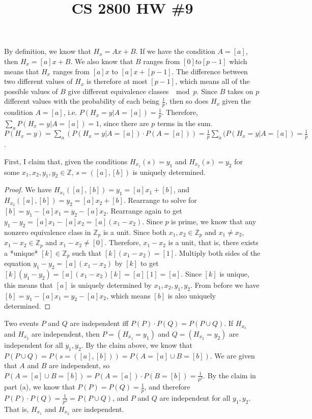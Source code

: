 

\title{CS 2800 HW \#9}
\author{\name}
\maketitle


By definition, we know that $H_x = Ax + B$. If we have the condition $A = [a]$, then $H_x = [a]x + B$. We also know that $B$ ranges from $[0] to [p - 1]$ which means that $H_x$ ranges from $[a]x$ to $[a]x + [p - 1]$. The difference between two different values of $H_x$ is therefore at most $[p - 1]$, which means all of the possible values of $B$ give different equivalence classes $\mod p$. Since $B$ takes on $p$ different values with the probability of each being $\frac{1}{p}$, then so does $H_x$ given the condition $A = [a]$, i.e. $P(H_x = y | A = [a]) = \frac{1}{p}$. Therefore, $\sum_a P(H_x = y | A = [a]) = 1$, since there are $p$ terms in the sum. $P(H_x = y) = \sum_a (P(H_x = y | A = [a]) \cdot P(A = [a])) = \frac{1}{p} \sum_a (P(H_x = y | A = [a]) = \frac{1}{p}$.

First, I claim that, given the conditions $H_{x_1}(s) = y_1$ and $H_{x_2}(s) = y_2$ for some $x_1, x_2, y_1, y_2 \in \mathbb{Z}$, $s = ([a], [b])$ is uniquely determined.

\begin{proof}
  We have $H_{x_1}([a], [b]) = y_1 = [a]x_1 + [b]$, and $H_{x_2}([a], [b]) = y_2 = [a]x_2 + [b]$. Rearrange to solve for $[b] = y_1 - [a]x_1 = y_2 - [a]x_2$. Rearrange again to get $y_1 - y_2 = [a]x_1 - [a]x_2 = [a](x_1 - x_2)$. Since $p$ is prime, we know that any nonzero equivalence class in $\mathbb{Z}_p$ is a unit. Since both $x_1, x_2 \in \mathbb{Z}_p$ and $x_1 \neq x_2$, $x_1 - x_2 \in \mathbb{Z}_p$ and $x_1 - x_2 \neq [0]$. Therefore, $x_1 - x_2$ is a unit, that is, there exists a *unique* $[k] \in \mathbb{Z}_p$ such that $[k](x_1 - x_2) = [1]$.
  Multiply both sides of the equation $y_1 - y_2 = [a](x_1 - x_2)$ by $[k]$ to get $[k](y_1 - y_2) = [a](x_1 - x_2)[k] = [a][1] = [a]$. Since $[k]$ is unique, this means that $[a]$ is uniquely determined by $x_1, x_2, y_1, y_2$. From before we have $[b] = y_1 - [a]x_1 = y_2 - [a]x_2$, which means $[b]$ is also uniquely determined.
\end{proof}

Two events $P$ and $Q$ are independent iff $P(P) \cdot P(Q) = P(P \cup Q)$. If $H_{x_1}$ and $H_{x_2}$ are independent, then $P = (H_{x_1} = y_1)$ and $Q = (H_{x_2} = y_2)$ are independent for all $y_1, y_2$.
By the claim above, we know that $P(P \cup Q) = P(s = ([a], [b])) = P(A = [a] \cup B = [b])$. We are given that $A$ and $B$ are independent, so $P(A = [a] \cup B = [b]) = P(A = [a]) \cdot P(B = [b]) = \frac{1}{p^2}$. By the claim in part (a), we know that $P(P) = P(Q) = \frac{1}{p}$, and therefore $P(P) \cdot P(Q) = \frac{1}{p^2} = P(P \cup Q)$, and $P$ and $Q$ are independent for all $y_1, y_2$. That is, $H_{x_1}$ and $H_{x_2}$ are independent.

